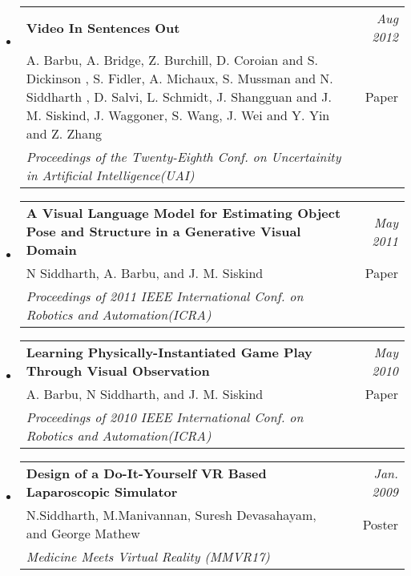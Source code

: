 \documentclass[10pt]{article}
\makeatletter
\newenvironment{publication}[6]
{ \item
  \begin{tabular*}{6.5in}{p{5.2in}@{\extracolsep{\fill}}r}
    \textbf{#1} & \textit{#2}\\ #3 & \footnotesize{#4}\\ \textit{#5}\\ #6
  \end{tabular*}
} {}
\newenvironment{region}[1] {{\large \textbf{#1}} \begin{itemize}} {\end{itemize}}
\makeatother
\begin{document}
\begin{region} {Publications / Posters}
  \begin{publication} {Video In Sentences Out}
    {Aug 2012}
    {A. Barbu, A. Bridge, Z. Burchill, D. Coroian and S. Dickinson , S. Fidler,
     A. Michaux, S. Mussman and N. Siddharth , D. Salvi, L. Schmidt, J. Shangguan and
     J. M. Siskind, J. Waggoner, S. Wang, J. Wei and Y. Yin and Z. Zhang}
    {Paper}
    {Proceedings of the Twenty-Eighth Conf. on Uncertainity in Artificial Intelligence(UAI)}
    {}
  \end{publication}
  \begin{publication} {A Visual Language Model for Estimating Object
      Pose and Structure in a Generative Visual Domain}
    {May 2011}
    {N Siddharth, A. Barbu, and J. M. Siskind}
    {Paper}
    {Proceedings of 2011 IEEE International Conf. on Robotics and Automation(ICRA)}
    {}
  \end{publication}
  \begin{publication}{Learning Physically-Instantiated Game Play Through Visual Observation}
    {May 2010}
    {A. Barbu, N Siddharth, and J. M. Siskind}
    {Paper}
    {Proceedings of 2010 IEEE International Conf. on Robotics and Automation(ICRA)}
    {}
  \end{publication}
  \begin{publication} {Design of a Do-It-Yourself VR Based Laparoscopic Simulator}
    {Jan. 2009}
    {N.Siddharth, M.Manivannan, Suresh Devasahayam, and George Mathew}
    {Poster}
    {Medicine Meets Virtual Reality (MMVR17)}
    {}
  \end{publication}
\end{region}
\end{document}
